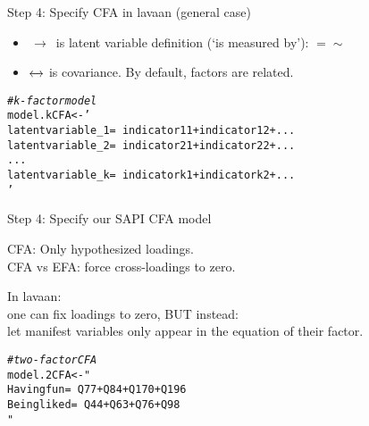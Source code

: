 \documentclass[10pt]{beamer}\usepackage[]{graphicx}\usepackage[]{xcolor}
\makeatletter
\newcommand{\hlsng}[1]{\textcolor[rgb]{0.192,0.494,0.8}{#1}}%
\newcommand{\hlcom}[1]{\textcolor[rgb]{0.678,0.584,0.686}{\textit{#1}}}%
\newcommand{\hldef}[1]{\textcolor[rgb]{0.345,0.345,0.345}{#1}}%
\newcommand{\hlkwb}[1]{\textcolor[rgb]{0.69,0.353,0.396}{#1}}%
\newenvironment{kframe}{%
 \def\at@end@of@kframe{}%
 \ifinner\ifhmode%
  \def\at@end@of@kframe{\end{minipage}}%
  \begin{minipage}{\columnwidth}%
 \fi\fi%
 \def\FrameCommand##1{\hskip\@totalleftmargin \hskip-\fboxsep
 \colorbox{shadecolor}{##1}\hskip-\fboxsep
     \hskip-\linewidth \hskip-\@totalleftmargin \hskip\columnwidth}%
 \MakeFramed {\advance\hsize-\width
   \@totalleftmargin\z@ \linewidth\hsize
   \@setminipage}}%
 {\par\unskip\endMakeFramed%
 \at@end@of@kframe}
\newenvironment{knitrout}{}{} %
\makeatother
\begin{document}
\begin{frame}[fragile]{Step 4: Specify CFA in lavaan (general case)}

\begin{itemize}
  \item $\,\to\,$ is latent variable definition (`is measured by'): $=\sim$ 
  \item $\xleftrightarrow{}$ is covariance. By default, factors are related. %
\end{itemize}

\begin{knitrout}
\color{fgcolor}\begin{kframe}
\begin{alltt}
\hlcom{# k-factor model}
\hldef{model.kCFA} \hlkwb{<-} \hlsng{'
latent variable_1 =~ indicator11 + indicator12 + ...
latent variable_2 =~ indicator21 + indicator22 + ...
...
latent variable_k =~ indicatork1 + indicatork2 + ...
'}
\end{alltt}
\end{kframe}
\end{knitrout}

\end{frame}
%
\begin{frame}[fragile]{Step 4: Specify our SAPI CFA model}

CFA: Only hypothesized loadings.\\
CFA vs EFA: force cross-loadings to zero.

\vspace{5mm}

In lavaan: \\
one can fix loadings to zero, BUT instead:\\
let manifest variables only appear in the equation of their factor.

\vspace{5mm}

\begin{knitrout}
\color{fgcolor}\begin{kframe}
\begin{alltt}
\hlcom{# two-factor CFA}
\hldef{model.2CFA} \hlkwb{<-} \hlsng{"
 Havingfun  =~ Q77 + Q84 + Q170 + Q196 
 Beingliked =~ Q44 + Q63 + Q76  + Q98
"}
\end{alltt}
\end{kframe}
\end{knitrout}

\end{frame}
\end{document}

